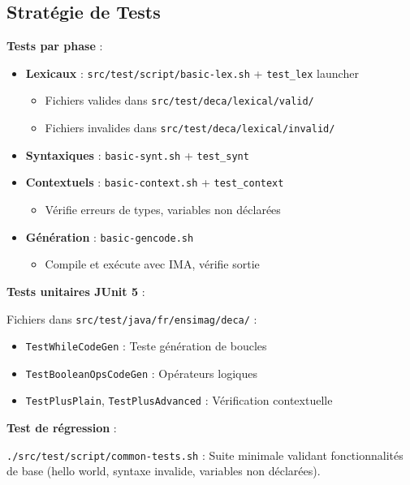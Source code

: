 \documentclass[12pt,a4paper]{article}
\begin{document}
\subsection{Stratégie de Tests}

\textbf{Tests par phase} :

\begin{itemize}[itemsep=0.3em]
    \item \textbf{Lexicaux} : \texttt{src/test/script/basic-lex.sh} + \texttt{test\_lex} launcher
    \begin{itemize}
        \item Fichiers valides dans \texttt{src/test/deca/lexical/valid/}
        \item Fichiers invalides dans \texttt{src/test/deca/lexical/invalid/}
    \end{itemize}
    \item \textbf{Syntaxiques} : \texttt{basic-synt.sh} + \texttt{test\_synt}
    \item \textbf{Contextuels} : \texttt{basic-context.sh} + \texttt{test\_context}
    \begin{itemize}
        \item Vérifie erreurs de types, variables non déclarées
    \end{itemize}
    \item \textbf{Génération} : \texttt{basic-gencode.sh}
    \begin{itemize}
        \item Compile et exécute avec IMA, vérifie sortie
    \end{itemize}
\end{itemize}

\textbf{Tests unitaires JUnit 5} :

Fichiers dans \texttt{src/test/java/fr/ensimag/deca/} :

\begin{itemize}[itemsep=0.2em]
    \item \texttt{TestWhileCodeGen} : Teste génération de boucles
    \item \texttt{TestBooleanOpsCodeGen} : Opérateurs logiques
    \item \texttt{TestPlusPlain}, \texttt{TestPlusAdvanced} : Vérification contextuelle
\end{itemize}

\textbf{Test de régression} :

\texttt{./src/test/script/common-tests.sh} : Suite minimale validant fonctionnalités de base (hello world, syntaxe invalide, variables non déclarées).
\end{document}
